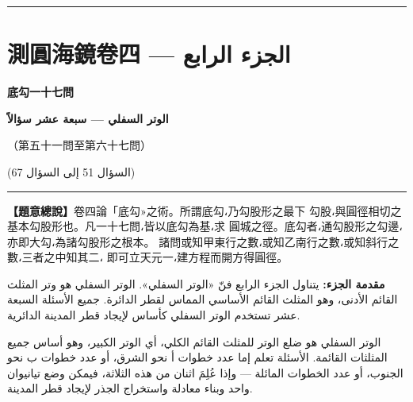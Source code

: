 \documentclass[11pt,a4paper]{article}
\newcommand{\ar}[1]{\arabicfont\beginR #1\endR}
\newcommand{\longline}{\noindent\rule{\textwidth}{0.4pt}}
\newcounter{probnum}
\begin{document}
\vspace{0.5cm}
\longline
\newpage

\setcounter{probnum}{0}

\section{測圓海鏡卷四 — \ar{الجزء الرابع}}
\label{sec:vol4}

\begin{center}
{\Large\bfseries\color{volcolor} 底勾一十七問}

\vspace{0.2cm}

{\fontsize{14}{18}\selectfont\arabicfont\beginR\color{volcolor}\textbf{الوتر السفلي — سبعة عشر سؤالاً}\endR}

\vspace{0.2cm}

{\small\color{notecolor} （第五十一問至第六十七問）}

{\small\color{notecolor}\arabicfont\beginR (السؤال 51 إلى السؤال 67)\endR}
\end{center}

\vspace{0.3cm}
\longline
\vspace{0.3cm}

\noindent
\begin{minipage}[t]{0.48\textwidth}
\textbf{【題意總說】}卷四論「底勾»之術。所謂底勾،乃勾股形之最下
勾股،與圓徑相切之基本勾股形也。凡一十七問،皆以底勾為基،求
圓城之徑。底勾者،通勾股形之勾邊،亦即大勾،為諸勾股形之根本。
諸問或知甲東行之數،或知乙南行之數،或知斜行之數،三者之中知其二،
即可立天元一،建方程而開方得圓徑。
\end{minipage}
\hfill
\begin{minipage}[t]{0.48\textwidth}
\arabicfont\beginR
\textbf{مقدمة الجزء:} يتناول الجزء الرابع فنّ «الوتر السفلي».
الوتر السفلي هو وتر المثلث القائم الأدنى، وهو المثلث القائم
الأساسي المماس لقطر الدائرة. جميع الأسئلة السبعة عشر تستخدم
الوتر السفلي كأساس لإيجاد قطر المدينة الدائرية.

الوتر السفلي هو ضلع الوتر للمثلث القائم الكلي، أي الوتر الكبير،
وهو أساس جميع المثلثات القائمة. الأسئلة تعلم إما عدد خطوات أ
نحو الشرق، أو عدد خطوات ب نحو الجنوب، أو عدد الخطوات المائلة —
وإذا عُلِمَ اثنان من هذه الثلاثة، فيمكن وضع تيانيوان واحد وبناء
معادلة واستخراج الجذر لإيجاد قطر المدينة.
\endR
\end{minipage}
\end{document}
